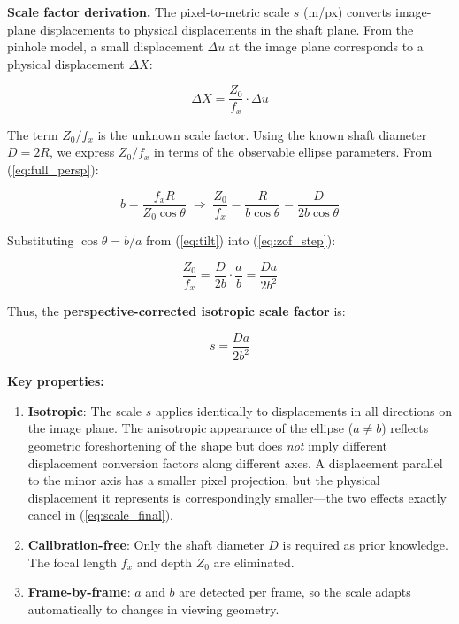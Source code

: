 \documentclass[journal]{IEEEtran}
\begin{document}
\noindent \textbf{Scale factor derivation.} The pixel-to-metric scale $s$ (m/px)
converts image-plane displacements to physical displacements in the shaft plane.
From the pinhole model, a small displacement $\Delta u$ at the image plane
corresponds to a physical displacement $\Delta X$:

\begin{equation}
\Delta X = \frac{Z_0}{f_x} \cdot \Delta u
\label{eq:scale_def}
\end{equation}

The term $Z_0/f_x$ is the unknown scale factor. Using the known shaft diameter
$D = 2R$, we express $Z_0/f_x$ in terms of the observable ellipse parameters.
From (\ref{eq:full_persp}):

\begin{equation}
b = \frac{f_x R}{Z_0 \cos\theta} \;\Longrightarrow\;
\frac{Z_0}{f_x} = \frac{R}{b \cos\theta} = \frac{D}{2b \cos\theta}
\label{eq:zof_step}
\end{equation}

Substituting $\cos\theta = b/a$ from (\ref{eq:tilt}) into (\ref{eq:zof_step}):

\begin{equation}
\frac{Z_0}{f_x} = \frac{D}{2b} \cdot \frac{a}{b} = \frac{D a}{2 b^{2}}
\label{eq:scale_derive}
\end{equation}

Thus, the \textbf{perspective-corrected isotropic scale factor} is:

\begin{equation}
\boxed{s = \frac{D a}{2 b^{2}}}
\label{eq:scale_final}
\end{equation}

\noindent \textbf{Key properties:}
\begin{enumerate}
\item \textbf{Isotropic}: The scale $s$ applies identically to displacements
in all directions on the image plane. The anisotropic appearance of the
ellipse ($a \neq b$) reflects geometric foreshortening of the shape but
does \emph{not} imply different displacement conversion factors along
different axes. A displacement parallel to the minor axis has a smaller
pixel projection, but the physical displacement it represents is
correspondingly smaller---the two effects exactly cancel in
(\ref{eq:scale_final}).
\item \textbf{Calibration-free}: Only the shaft diameter $D$ is required as
prior knowledge. The focal length $f_x$ and depth $Z_0$ are eliminated.
\item \textbf{Frame-by-frame}: $a$ and $b$ are detected per frame, so the
scale adapts automatically to changes in viewing geometry.
\end{enumerate}
\end{document}
